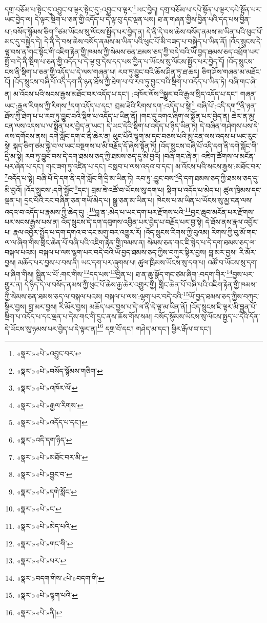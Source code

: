 དགྲ་བཅོམ་པ་སྟེང་དུ་འབྱུང་བ་ལྟར་སྟེང་དུ་:འབྱུང་བ་ལྟར་\footnote{«སྣར་»«པེ་»འབྱུང་བར་}ཡང་བྱེད། དགྲ་བཅོམ་པ་དཔེ་སྟོན་པ་ལྟར་དཔེ་སྟོན་པར་ཡང་བྱེད་ལ། དེ་ལྟར་སྡིག་པ་ཅན་གྱི་འདོད་པ་དེ་ལྟ་བུ་དང་ལྡན་པས། ཐ་ན་གཞན་གྱིས་བྱིན་པའི་དད་པས་བྱིན་པ་:བསོད་སྙོམས་ཅིག་\footnote{«སྣར་»«པེ་»བསོད་སྙོམས་གཅིག་}ཙམ་ཡོངས་སུ་ལོངས་སྤྱོད་པར་བྱེད་ན། དེ་ནི་དེ་བས་ཆེས་བསོད་ནམས་མ་ཡིན་པའི་ཕུང་པོ་མང་དུ་བསྐྱེད་དེ། དེ་ནི་དེ་བས་ཆེས་བསོད་ནམས་མ་ཡིན་པའི་ཕུང་པོ་མི་བཟད་པ་བསྐྱེད་པ་ཡིན་ནོ། །འོད་སྲུངས་དེ་ལྟ་བས་ན་གང་སྟོང་གི་འཇིག་རྟེན་གྱི་ཁམས་ཀྱི་སེམས་ཅན་ཐམས་ཅད་ཀྱི་བདེ་བའི་ཡོ་བྱད་ཐམས་ཅད་འཕྲོག་པར་སྤྲོ་བ་དེ་ནི་སྡིག་པ་ཅན་གྱི་འདོད་པ་དེ་ལྟ་བུ་དེས་དད་པས་བྱིན་པ་ཡོངས་སུ་ལོངས་སྤྱོད་པར་བྱེད་དོ། །འོད་སྲུངས་ངས་ནི་སྡིག་པ་ཅན་གྱི་འདོད་པ་དེ་ལས་གཞན་པ། རབ་ཏུ་བྱུང་བའི་ཆོས་ཤིན་ཏུ་ཐ་ཆད། ཅིག་ཤོས་གཞན་མ་མཐོང་ངོ། །འོད་སྲུངས་བཞི་པོ་འདི་དག་ནི་ཉན་ཐོས་ཀྱི་ཐེག་པ་བ་རབ་ཏུ་བྱུང་བའི་སྡིག་པ་འདོད་པ་ཡིན་ཏེ། བཞི་གང་ཞེ་ན། མ་འོངས་པའི་སངས་རྒྱས་མཐོང་བར་འདོད་པ་དང་། :འཁོར་ལོས་\footnote{«སྣར་»«པེ་»འཁོར་ལོ་}སྒྱུར་བའི་རྒྱལ་སྲིད་འདོད་པ་དང་། གཞན་ཡང་:རྒྱལ་རིགས་ཀྱི་རིགས་\footnote{«སྣར་»«པེ་»རྒྱལ་རིགས་}དག་འདོད་པ་དང་། བྲམ་ཟེའི་རིགས་དག་:འདོད་པ་སྟེ།\footnote{«སྣར་»«པེ་»འདོད་པ་དང་།} བཞི་པོ་:འདི་དག་\footnote{«སྣར་»འདི་དག་ཉིད་}ནི་ཉན་ཐོས་ཀྱི་ཐེག་པ་པ་རབ་ཏུ་བྱུང་བའི་སྡིག་པ་འདོད་པ་ཡིན་ནོ། །གང་དུ་འགའ་ཞིག་ལ་སྨོན་པར་བྱེད་ན། ཆེར་ན་མྱ་ངན་ལས་འདས་པ་ལ་སྨོན་པར་བྱེད་ན་ཡང་། དེ་ཡང་དེའི་སྡིག་པ་འདོད་པ་ཉིད་ཡིན་ཏེ། དེ་བཞིན་གཤེགས་པས་དེ་ལས་དགོངས་ནས། དགེ་སློང་དག་ང་ནི་ཆེར་ན། ཕུང་པོའི་ལྷག་མ་དང་བཅས་པའི་མྱ་ངན་ལས་འདས་པ་ཡང་རུང་སྟེ། སྐད་ཅིག་ཙམ་སྐྱེ་བ་ལ་ཡང་བསྔགས་པ་མི་བརྗོད་དོ་ཞེས་སྟོན་ཏོ། །འོད་སྲུངས་བཞི་པོ་འདི་དག་ནི་དགེ་སློང་གི་དྲི་མ་སྟེ། རབ་ཏུ་བྱུང་བས་དེ་དག་ཐམས་ཅད་ཀྱི་ཐམས་ཅད་དུ་མི་བྱའོ། །བཞི་གང་ཞེ་ན། འཇིག་ཚོགས་ལ་མངོན་པར་ཞེན་པ་དང་། གང་ཟག་ཏུ་འཛིན་པ་དང་། བསླབ་པ་ལས་འདའ་བ་དང་། མ་འོངས་པའི་སངས་རྒྱས་:མཐོང་བར་\footnote{«སྣར་»«པེ་»མཐོང་བར་མི་}འདོད་པ་སྟེ། བཞི་པོ་དེ་དག་ནི་དགེ་སློང་གི་དྲི་མ་ཡིན་ཏེ། རབ་ཏུ་:བྱུང་བས་\footnote{«སྣར་»«པེ་»བྱུང་བ་}དེ་དག་ཐམས་ཅད་ཀྱི་ཐམས་ཅད་དུ་མི་བྱའོ། །འོད་སྲུངས་:དགེ་སྦྱོང་\footnote{«སྣར་»«པེ་»དགེ་སློང་}དང་། བྲམ་ཟེ་འཚོ་བ་ཡོངས་སུ་དག་པ། སྡིག་པ་འདོད་པ་མེད་པ། ཚུལ་ཁྲིམས་དང་ལྡན་པ། དྲང་པོའི་རང་བཞིན་ཅན་གཡོ་མེད་པ། སྒྱུ་ཅན་མ་ཡིན་པ། ཁེངས་པ་མ་ཡིན་པ་ཡོངས་སུ་མྱ་ངན་ལས་འདའ་བ་འདོད་པ་རྣམས་ཀྱི་ཆེད་དུ། :\footnote{«སྣར་»«པེ་»ང་}བླ་ན་:མེད་པ་ཡང་དག་པར་རྫོགས་པའི་\footnote{«སྣར་»«པེ་»མེད་པའི་}བྱང་ཆུབ་མངོན་པར་རྫོགས་པར་སངས་རྒྱས་པས་ན། འོད་སྲུངས་དེ་དག་དབུགས་འབྱིན་པར་བྱེད་པ་བརྗོད་པར་བྱ་སྟེ། དེ་ཐོས་ནས་རྣལ་འབྱོར་པ། རྣལ་འབྱོར་སྤྱོད་པ་དག་དགའ་བ་དང་མགུ་བར་འགྱུར་རོ། །འོད་སྲུངས་རིགས་ཀྱི་བུའམ། རིགས་ཀྱི་བུ་མོ་གང་ལ་ལ་ཞིག་གིས་གླིང་ཆེན་པོ་བཞི་པའི་འཇིག་རྟེན་གྱི་ཁམས་ན། སེམས་ཅན་གང་ཇི་སྙེད་པ་དེ་དག་ཐམས་ཅད་ལ་བསྐལ་པའམ། བསྐལ་པ་ལས་ལྷག་པར་བདེ་བའི་ཡོ་བྱད་ཐམས་ཅད་ཀྱིས་བཀུར་སྟིར་བྱས། བླ་མར་བྱས། རི་མོར་བྱས། མཆོད་པར་བྱས་པ་བས་ནི། ཡང་དག་པར་ཞུགས་པ། ཚུལ་ཁྲིམས་ཡོངས་སུ་དག་པ། འཚོ་བ་ཡོངས་སུ་དག་པ་ཞིག་གིས། སྦྱིན་པ་པོ་:གང་གིས་\footnote{«སྣར་»«པེ་»གང་གི་}དད་པས་\footnote{«སྣར་»«པེ་»པར་}བྱིན་པ། ཐ་ན་ཆུ་སྣོད་གང་ཙམ་ཞིག་:བདག་གིར་\footnote{«སྣར་»བདག་གིས་«པེ་»བདག་གི་}བྱས་པར་གྱུར་ན། དེ་ཉིད་དེ་ལ་བསོད་ནམས་ཀྱི་ཕུང་པོ་ཆེས་རྒྱ་ཆེར་འགྱུར་གྱི། གླིང་ཆེན་པོ་བཞི་པའི་འཇིག་རྟེན་གྱི་ཁམས་ཀྱི་སེམས་ཅན་ཐམས་ཅད་ལ་བསྐལ་པའམ། བསྐལ་པ་ལས་:ལྷག་པར་བདེ་བའི་\footnote{«སྣར་»«པེ་»ལྷག་པའི་}ཡོ་བྱད་ཐམས་ཅད་ཀྱིས་བཀུར་སྟིར་བྱས། བླ་མར་བྱས། རི་མོར་བྱས། མཆོད་པར་བྱས་པ་དེ་ལ་ནི་དེ་ལྟ་མ་ཡིན་ནོ། །འོད་སྲུངས་ཇི་ལྟར་མི་བླུན་པོ་སྡིག་པ་འདོད་པ་དང་ལྡན་པ་དེས་གང་གི་དྲུང་ནས་ཆོས་གོས་སམ། བསོད་སྙོམས་ཡོངས་སུ་ལོངས་སྤྱད་པ་དེའི་དོན་དེ་ཡོངས་སུ་ཉམས་པར་བྱེད་པ་དེ་ལྟར་ན།\footnote{«སྣར་»«པེ་»ནི།} དགྲ་བོ་དང་། གཤེད་མ་དང་། ཕྱིར་རྒོལ་བ་དང་། 